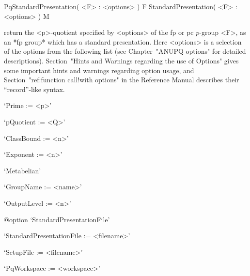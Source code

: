 
\>PqStandardPresentation( <F> : <options> ) F
\>StandardPresentation( <F> : <options> ) M

return the <p>-quotient specified by  <options> of the fp or pc $p$-group
<F>, as an *fp group*  which has a standard presentation.  Here <options>
is a selection of the options from the following list (see Chapter~"ANUPQ
options"  for   detailed  descriptions).   Section~"Hints   and  Warnings
regarding the  use of  Options" gives some  important hints  and warnings
regarding option  usage, and Section~"ref:function  call!with options" in
the {\GAP} Reference Manual describes their ``record''-like syntax.

\beginlist%

\item{}`Prime := <p>'

\item{}`pQuotient := <Q>'

\item{}`ClassBound := <n>'

\item{}`Exponent := <n>'

\item{}`Metabelian'

\item{}`GroupName := <name>'

\item{}`OutputLevel := <n>'

%
{@option \noexpand`StandardPresentationFile'}
\item{}`StandardPresentationFile := <filename>'

\item{}`SetupFile := <filename>'

\item{}`PqWorkspace := <workspace>'

